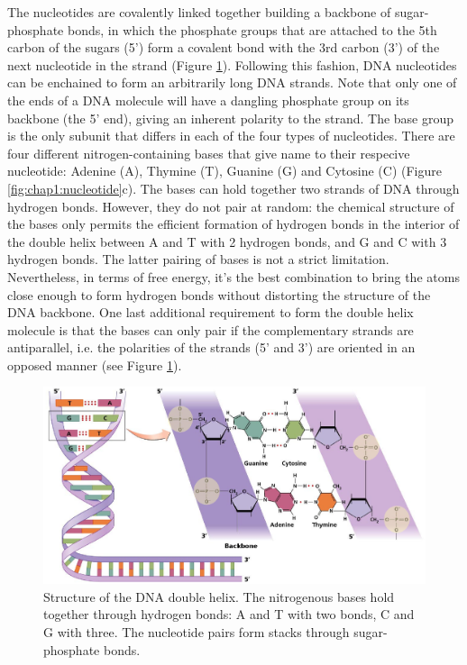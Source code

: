 The nucleotides are covalently linked together building a backbone
of sugar-phosphate bonds, in which the phosphate groups that are
attached to the 5th carbon of the sugars (5') form a covalent bond
with the 3rd carbon (3') of the next nucleotide in the strand (Figure
\ref{fig:chap1:dna_structure}). Following this fashion, DNA nucleotides can be enchained to form
an arbitrarily long DNA strands. Note that only one of the ends of a
DNA molecule will have a dangling phosphate group on its backbone (the 5' end),
giving an inherent polarity to the strand. The base group is the only
subunit that differs in each of the four types of nucleotides. There
are four different nitrogen-containing bases that give name to their
respecive nucleotide: Adenine (A), Thymine (T), Guanine (G) and
Cytosine (C) (Figure \ref{fig:chap1:nucleotide}c). The bases can hold together two strands of
DNA through hydrogen bonds. However, they do not pair at random: the
chemical structure of the bases only permits the efficient formation
of hydrogen bonds in the interior of the double helix between A and T
with 2 hydrogen bonds, and G and C with 3 hydrogen bonds. The latter 
pairing of bases is not a strict limitation. Nevertheless, in terms of
free energy, it's the best combination to bring the atoms close enough
to form hydrogen bonds without distorting the structure of the DNA
backbone. One last additional requirement to form the double helix
molecule is that the bases can only pair if the complementary strands
are antiparallel, i.e. the polarities of the strands (5' and 3') are
oriented in an opposed manner (see Figure
\ref{fig:chap1:dna_structure}).

\begin{figure}[h]
	\begin{minipage}[b]{\linewidth}
	  \centering
	  \includegraphics[width=\textwidth]{figures/chap1_dna_structure}
	  \caption{Structure of the DNA double helix. The nitrogenous bases
     hold together through hydrogen bonds: A and T with two bonds, C
     and G with three. The nucleotide pairs form stacks through
     sugar-phosphate bonds.}
	  \label{fig:chap1:dna_structure}
   \end{minipage}
\end{figure}


